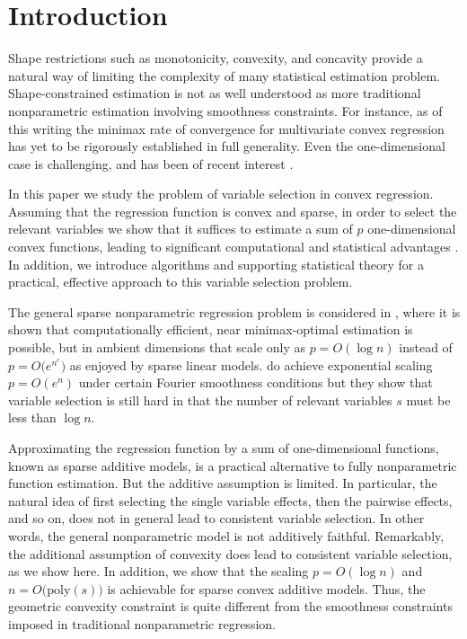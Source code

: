 \section{Introduction}


Shape restrictions such as monotonicity, convexity, and concavity
provide a natural way of limiting the complexity of many statistical
estimation problem.  Shape-constrained estimation is not as well
understood as more traditional nonparametric estimation involving
smoothness constraints.  For instance, as of this writing the minimax
rate of convergence for multivariate convex regression has yet to be
rigorously established in full generality.  Even the one-dimensional
case is challenging, and has been of recent interest
\citep{guntusen:13}.

In this paper we study the problem of variable selection
in convex regression.   Assuming that the regression
function is convex and sparse, in order to select the
relevant variables we 
show that it suffices to estimate a sum of $p$ one-dimensional convex
functions, leading to significant computational and statistical
advantages .  In addition, we introduce algorithms and supporting
statistical theory for a practical, effective approach to this
variable selection problem.

The general sparse nonparametric regression problem is considered in \cite{lafferty2008rodeo}, where it is shown that computationally efficient, near minimax-optimal estimation is possible, but in ambient
dimensions that scale only as $p = O(\log n)$ instead of $p=O\bigl(e^{n^c}\bigr)$ as enjoyed by sparse linear models. \citet{dalalyan:12} do achieve exponential scaling $p=O(e^n)$ under certain Fourier smoothness conditions but they show that variable selection is still hard in that the number of relevant variables $s$ must be less than $\log n$.


Approximating the regression function by a sum of one-dimensional functions, known as sparse additive models, \cite{Ravikumar:09} is a practical alternative to fully
nonparametric function estimation.  But the additive assumption is
limited.  In particular, the natural idea of first selecting the
single variable effects, then the pairwise effects, and so on, does
not in general lead to consistent variable selection.  In other words,
the general nonparametric model is not additively faithful.
Remarkably, the additional assumption of convexity does lead to
consistent variable selection, as we show here. In addition, we show that
the scaling $p = O(\log n)$ and $n = O\big(\textrm{poly}(s)\big)$ is achievable for sparse convex additive models. Thus, the geometric convexity constraint is quite different from the
smoothness constraints imposed in traditional nonparametric
regression.

